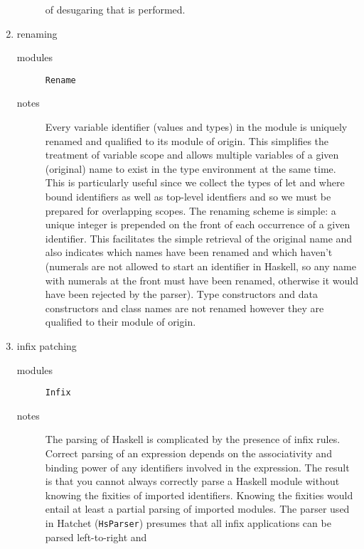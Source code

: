 \documentclass{article}
\begin{document}
\begin{enumerate}
\begin{description}
                 of desugaring that is performed.
     \end{description}
\item renaming 
     \begin{description}
     \item[modules] \texttt{Rename}
     \item[notes] Every variable identifier (values and types) in the 
                  module is uniquely renamed and
                  qualified to its module of origin. This simplifies the
                treatment of variable scope and allows multiple variables
                of a given (original) name to exist in the type environment
                at the same time. This is particularly useful since we 
                collect the types of let and where bound identifiers
                as well as top-level identfiers and so we must be
                prepared for overlapping scopes.
                The renaming scheme is simple: a unique
                integer is prepended on the front of each occurrence of
                a given identifier. This facilitates the simple retrieval
                of the original name and also indicates which names have
                been renamed and which haven't (numerals are not allowed
                to start an identifier in Haskell, so any name with numerals
                at the front must have been renamed, otherwise it would
                have been rejected by the parser). Type constructors and
                data constructors and class names are not renamed 
                however they are qualified to their module of origin.
     \end{description}
\item infix patching 
     \begin{description}
     \item[modules] \texttt{Infix}
     \item[notes] The parsing of Haskell is complicated by the presence
                of infix rules. Correct parsing of an expression depends on the 
                associativity and binding power of any identifiers
                involved in the expression. The result is that you cannot
                always correctly parse a Haskell module without knowing
                the fixities of imported identifiers. Knowing the fixities
                would entail at least a partial parsing of imported modules.
                The parser used in Hatchet (\texttt{HsParser}) presumes
                that all infix applications can be parsed left-to-right and

\end{description}
\end{enumerate}
\end{document}
